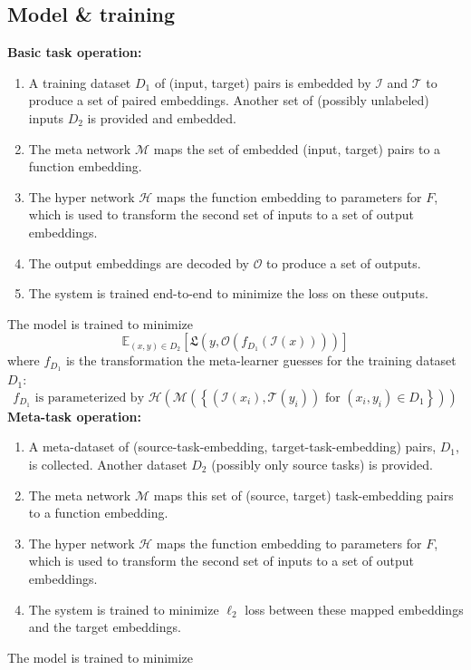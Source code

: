 \documentclass{article}
\begin{document}
\subsection{Model \& training} \label{app_model_details}
\textbf{Basic task operation:}
\begin{enumerate}
\item A training dataset $D_1$ of (input, target) pairs is embedded by $\mathcal{I}$ and $\mathcal{T}$ to produce a set of paired embeddings. Another set of (possibly unlabeled) inputs $D_2$ is provided and embedded.
\item The meta network $\mathcal{M}$ maps the set of embedded (input, target) pairs to a function embedding.
\item The hyper network $\mathcal{H}$ maps the function embedding to parameters for $F$, which is used to transform the second set of inputs to a set of output embeddings.
\item The output embeddings are decoded by $\mathcal{O}$ to produce a set of outputs.
\item The system is trained end-to-end to minimize the loss on these outputs.
\end{enumerate}
The model is trained to minimize 
\[\mathbb{E}_{(x, y)\in {D}_2} \left[ \mathfrak{L}\left(y, \mathcal{O}\left(f_{D_1}\left(\mathcal{I} \left(x\right)\right) \right)\right)\right]\]
where $f_{D_1}$ is the transformation the meta-learner guesses for the training dataset $D_1$:
\[f_{D_1} \text{ is parameterized by } \mathcal{H}\left(\mathcal{M}\left( \left\{\left(\mathcal{I}\left(x_i\right), \mathcal{T}\left(y_i\right) \right) \text{ for } (x_i, y_i) \in D_1 \right\}\right)\right)\]
\textbf{Meta-task operation:}
\begin{enumerate}
\item A meta-dataset of (source-task-embedding, target-task-embedding) pairs, $D_1$, is collected. Another dataset $D_2$ (possibly only source tasks) is provided.
\item The meta network $\mathcal{M}$ maps this set of (source, target) task-embedding pairs to a function embedding.
\item The hyper network $\mathcal{H}$ maps the function embedding to parameters for $F$, which is used to transform the second set of inputs to a set of output embeddings.
\item The system is trained to minimize $\ell_2$ loss between these mapped embeddings and the target embeddings. 
\end{enumerate}
The model is trained to minimize
\end{document}
